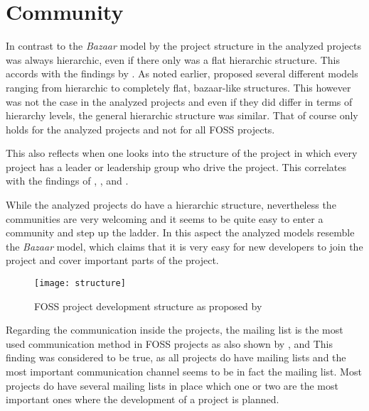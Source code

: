 
\section{Community} %

In contrast to the \emph{Bazaar} model by \textcite{Raymond1998} the project
structure in the analyzed projects was always hierarchic, even if there only
was a flat hierarchic structure. This accords with the findings by
\textcite{Crowston2005}. As noted earlier, \textcite{Ghosh2005} proposed
several different models ranging from hierarchic to completely flat,
bazaar-like structures. This however was not the case in the analyzed projects
and even if they did differ in terms of hierarchy levels, the general
hierarchic structure was similar. That of course only holds for the analyzed
projects and not for all \ac{FOSS} projects.

This also reflects when one looks into the structure of the project in which
every project has a leader or leadership group who drive the project. This
correlates with the findings of \textcite{Johnson2001},
\textcite{Crowston2005a}, \textcite{Warsta2003} and
\textcite{Krishnamurthy2002}.

While the analyzed projects do have a hierarchic structure, nevertheless the
communities are very welcoming and it seems to be quite easy to enter a
community and step up the ladder. In this aspect the analyzed models resemble
the \emph{Bazaar} model, which claims that it is very easy for new developers
to join the project and cover important parts of the project.

\begin{figure}[htbp]
  \centering
  \texttt{[image: structure]}
  \caption{\acl{FOSS} project development structure as proposed by \textcite{Crowston2005}}
\end{figure}

Regarding the communication inside the projects, the mailing list is the most
used communication method in \ac{FOSS} projects as also shown by
\textcite{Schweik2003}, \textcite{Ogawa2007} and \textcite{Kim2003} This
finding was considered to be true, as all projects do have mailing lists and
the most important communication channel seems to be in fact the mailing list.
Most projects do have several mailing lists in place which one or two are the
most important ones where the development of a project is planned.


